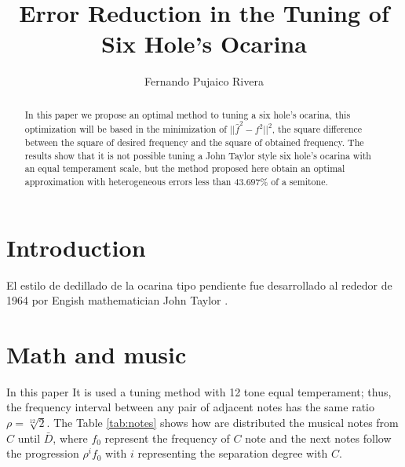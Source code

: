 \documentclass{article}
\title{ Error Reduction in the Tuning of Six Hole's Ocarina }
\author{Fernando Pujaico Rivera}
\date{ }
\begin{document}
\maketitle


\begin{abstract}
In this paper we propose an optimal method to tuning a six hole's ocarina,
this optimization will be based in the minimization of $|| \hat{f}^2-f^2||^2$, the square difference between the square of desired frequency and the square of obtained frequency.
The results show that it is not possible tuning a John Taylor style six hole's ocarina with an equal temperament scale,
but the method proposed here obtain an optimal approximation with heterogeneous errors less than $43.697\%$ of a semitone.
\end{abstract}



\section{Introduction}

El  estilo de dedillado de la ocarina tipo pendiente fue desarrollado al rededor de 1964
por Engish mathematician John Taylor \cite[pp. 79]{metropolitan1985american} \cite[pp. 10]{galpin2001newsletter}.


\section{Math and music}
In this paper It is used a tuning method with 12 tone equal temperament; thus, the frequency interval
between any pair of adjacent notes has the same ratio $\rho = {\sqrt[12]{2}}$.
The Table \ref{tab:notes} shows how are distributed the musical notes from $C$ until $\bar{D}$,
where $f_0$ represent the frequency of $C$ note and the next notes
follow the progression ${\rho}^i f_{0}$ with $i$ representing the separation degree with $C$. 
\end{document}
